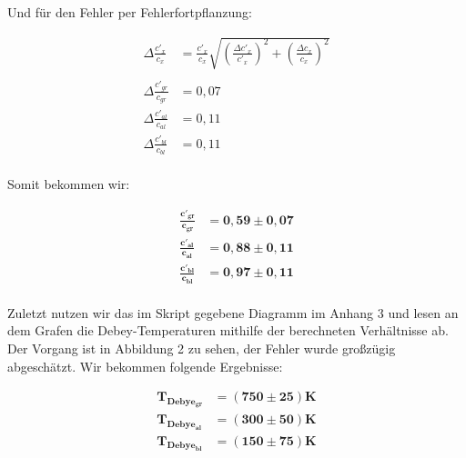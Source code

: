 \documentclass{article}
\begin{document}
Und für den Fehler per Fehlerfortpflanzung:

\begin{equation}
    \begin{split}
        \Delta \frac{c'_{x}}{c_{x}} &= \frac{c'_{x}}{c_{x}} \sqrt{\left( \frac{\Delta c'_{x}}{c'_{x}} \right)^2 + \left( \frac{\Delta c_{x}}{c_{x}} \right)^2} \\ \\
        \Delta \frac{c'_{gr}}{c_{gr}} &= 0,07 \\
        \Delta \frac{c'_{al}}{c_{al}} &= 0,11 \\
        \Delta \frac{c'_{bl}}{c_{bl}} &= 0,11 \\
    \end{split}
\end{equation}

Somit bekommen wir:

\begin{equation}
    \begin{split}
        \bm{\frac{c'_{gr}}{c_{gr}}} &= \bm{0,59 \pm 0,07} \\
        \bm{\frac{c'_{al}}{c_{al}}} &= \bm{0,88 \pm 0,11} \\
        \bm{\frac{c'_{bl}}{c_{bl}}} &= \bm{0,97 \pm 0,11} \\
    \end{split}
\end{equation}

\newpage
Zuletzt nutzen wir das im Skript gegebene Diagramm im Anhang 3 und lesen an dem Grafen die Debey-Temperaturen mithilfe der berechneten Verhältnisse ab. Der Vorgang ist in Abbildung 2 zu sehen, der Fehler wurde großzügig abgeschätzt. Wir bekommen folgende Ergebnisse:

\begin{equation}
    \begin{split}
        \bm{T_{Debye_{gr}}} &= \bm{(750 \pm 25)} \textbf{K} \\
        \bm{T_{Debye_{al}}} &= \bm{(300 \pm 50)} \textbf{K} \\
        \bm{T_{Debye_{bl}}} &= \bm{(150 \pm 75)} \textbf{K} \\
    \end{split}
\end{equation}
\end{document}
